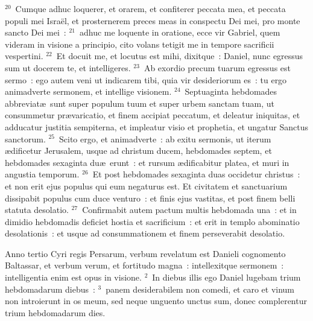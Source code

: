 ${}^{20}$~Cumque adhuc loquerer, et orarem, et confiterer peccata mea, et peccata populi mei Isra\"el, et prosternerem preces meas in conspectu Dei mei, pro monte sancto Dei mei~:
${}^{21}$~adhuc me loquente in oratione, ecce vir Gabriel, quem videram in visione a principio, cito volans tetigit me in tempore sacrificii vespertini.
${}^{22}$~Et docuit me, et locutus est mihi, dixitque~: Daniel, nunc egressus sum ut docerem te, et intelligeres.
${}^{23}$~Ab exordio precum tuarum egressus est sermo~: ego autem veni ut indicarem tibi, quia vir desideriorum es~: tu ergo animadverte sermonem, et intellige visionem.
${}^{24}$~Septuaginta hebdomades abbreviat\ae\ sunt super populum tuum et super urbem sanctam tuam, ut consummetur pr\ae varicatio, et finem accipiat peccatum, et deleatur iniquitas, et adducatur justitia sempiterna, et impleatur visio et prophetia, et ungatur Sanctus sanctorum.
${}^{25}$~Scito ergo, et animadverte~: ab exitu sermonis, ut iterum \ae dificetur Jerusalem, usque ad christum ducem, hebdomades septem, et hebdomades sexaginta du\ae\ erunt~: et rursum \ae dificabitur platea, et muri in angustia temporum.
${}^{26}$~Et post hebdomades sexaginta duas occidetur christus~: et non erit ejus populus qui eum negaturus est. Et civitatem et sanctuarium dissipabit populus cum duce venturo~: et finis ejus vastitas, et post finem belli statuta desolatio.
${}^{27}$~Confirmabit autem pactum multis hebdomada una~: et in dimidio hebdomadis deficiet hostia et sacrificium~: et erit in templo abominatio desolationis~: et usque ad consummationem et finem perseverabit desolatio.

\bchapter
\lettrine[lines=3,image=true,loversize=0.05,lraise=-0.03]{A}{}nno tertio Cyri regis Persarum, verbum revelatum est Danieli cognomento Baltassar, et verbum verum, et fortitudo magna~: intellexitque sermonem~: intelligentia enim est opus in visione.
${}^{2}$~In diebus illis ego Daniel lugebam trium hebdomadarum diebus~:
${}^{3}$~panem desiderabilem non comedi, et caro et vinum non introierunt in os meum, sed neque unguento unctus sum, donec complerentur trium hebdomadarum dies.


